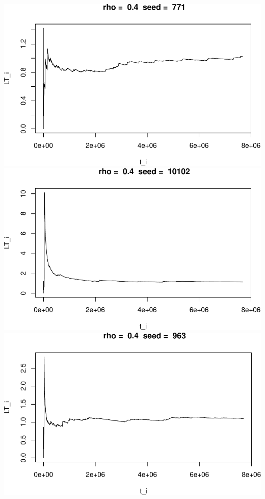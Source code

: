 \documentclass[]{article}
\begin{document}
\includegraphics{003_files/figure-latex/unnamed-chunk-14-1.pdf}
\includegraphics{003_files/figure-latex/unnamed-chunk-14-2.pdf}
\includegraphics{003_files/figure-latex/unnamed-chunk-14-3.pdf}
\end{document}

